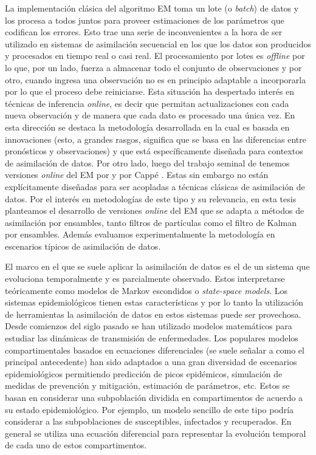 La implementación clásica del algoritmo EM toma un lote (o \textit{batch}) de datos y los procesa a todos juntos para proveer estimaciones de los parámetros que codifican los errores. Esto trae una serie de inconvenientes a la hora de ser utilizado en sistemas de asimilación secuencial en los que los datos son producidos y procesados en tiempo real o casi real. El procesamiento por lotes es \textit{offline} por lo que, por un lado, fuerza a almacenar todo el conjunto de observaciones y por otro, cuando ingresa una observación no es en principio adaptable a incorporarla por lo que el proceso debe reiniciarse. Esta situación ha despertado interés en técnicas de inferencia \textit{online}, es decir que permitan actualizaciones con cada nueva observación y de manera que cada dato es procesado una única vez. En esta dirección se destaca la metodología desarrollada en \cite{Berry2013} la cual es basada en innovaciones (esto, a grandes rasgos, significa que se basa en las diferencias entre pronósticos y observaciones) y que está específicamente diseñada para contextos de asimilación de datos. Por otro lado, luego del trabajo seminal de \cite{Neal1998} tenemos versiones \textit{online} del EM por \cite{Andrieu2003} y por Cappé \citep{Cappe2009,Cappe2011}. Estas sin embargo no están explícitamente diseñadas para ser acopladas a técnicas clásicas de asimilación de datos. Por el interés en metodologías de este tipo y su relevancia, en esta tesis planteamos el desarrollo de versiones \textit{online} del EM que se adapta a métodos de asimilación por ensambles, tanto filtros de partículas como el filtro de Kalman por ensambles. Además evaluamos experimentalmente la metodología en escenarios típicos de asimilación de datos.

El marco en el que se suele aplicar la asimilación de datos es el de un sistema que evoluciona temporalmente y es parcialmente observado. Estos interpretarse teóricamente como modelos de Markov escondidos o \textit{state-space models}. Los sistemas epidemiológicos tienen estas características y por lo tanto la utilización de herramientas la asimilación de datos en estos sistemas puede ser provechosa. Desde comienzos del siglo pasado se han utilizado modelos matemáticos para estudiar las dinámicas de transmisión de enfermedades. Los populares modelos compartimentales basados en ecuaciones diferenciales (se suele señalar a \cite{Kermack1927} como el principal antecedente) han sido adaptados a una gran diversidad de escenarios epidemiológicos permitiendo predicción de picos epidémicos, simulación de medidas de prevención y mitigación, estimación de parámetros, etc. Estos se basan en considerar una subpoblación dividida en compartimentos de acuerdo a su estado epidemiológico. Por ejemplo, un modelo sencillo de este tipo podría considerar a las subpoblaciones de susceptibles, infectados y recuperados. En general se utiliza una ecuación diferencial para representar la evolución temporal de cada uno de estos compartimentos.


